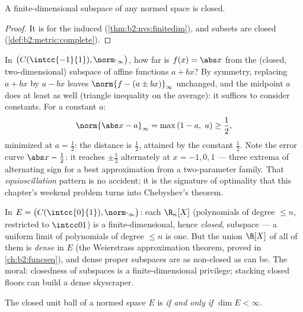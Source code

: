 \begin{corollary}\label{cor:b2:nvs:closedsubspace}
A finite-dimensional subspace of any normed space is closed.
\end{corollary}

\begin{proof}
It is  for the induced 
(\cref{thm:b2:nvs:finitedim}), and  subsets are closed
(\cref{def:b2:metric:complete}).
\end{proof}

\begin{example}\label{ex:b2:nvs:bestaffine}
In $\bigl(C(\intcc{-1}{1}), \norm\cdot_\infty\bigr)$, how far is
$f(x) = \abs x$ from the (closed, two-dimensional) subspace of
affine functions $a + bx$? By symmetry, replacing $a + bx$ by
$a - bx$ leaves $\norm{f - (a \pm bx)}_\infty$ unchanged, and
the midpoint $a$ does at least as well (triangle inequality on
the average): it suffices to consider constants. For a constant
$a$:
\[
\norm{\abs x - a}_\infty = \max\,(1 - a,\ a)
\geq \frac12 ,
\]
minimized at $a = \frac12$: the distance is $\frac12$, attained
by the constant $\frac12$. Note the error curve $\abs x -
\frac12$: it reaches $\pm\frac12$ alternately at $x = -1, 0,
1$ --- three extrema of alternating sign for a best
approximation from a two-parameter family. That
\emph{equioscillation} pattern is no accident; it is the
signature of optimality that this chapter's weekend problem
turns into Chebyshev's theorem.
\end{example}

\begin{example}\label{ex:b2:nvs:closeddense}
In $E = \bigl(C(\intcc{0}{1}), \norm\cdot_\infty\bigr)$: each
$\R_n[X]$ (polynomials of degree $\leq n$, restricted to
$\intcc01$) is a finite-dimensional, hence \emph{closed}, subspace
--- a uniform limit of polynomials of degree $\leq n$ is one. But
the union $\R[X]$ of all of them is \emph{dense} in $E$ (the
Weierstrass approximation theorem, proved in
\cref{ch:b2:funcseq}), and dense proper subspaces are as
non-closed as can be. The moral: closedness of subspaces is a
finite-dimensional privilege; stacking closed floors can build a
dense skyscraper.
\end{example}

\begin{theorem}[Riesz]\label{thm:b2:nvs:riesz}
The closed unit ball of a normed space $E$ is  \emph{if and
only if} $\dim E < \infty$.
\end{theorem}

